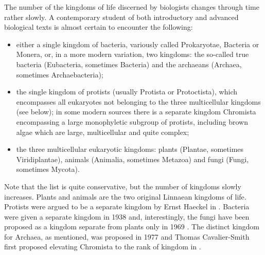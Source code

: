 \begin{artengenv}
The number of the kingdoms of life discerned by biologists changes through time rather slowly. A contemporary student of
both introductory and advanced biological texts is almost certain to encounter the following:

\begin{itemize}
\item either a single kingdom of bacteria, variously called Prokaryotae, Bacteria or Monera, or, in a more modern
variation, two kingdoms: the so-called true bacteria (Eubacteria, sometimes Bacteria) and the archaeans (Archaea,
sometimes Archaebacteria);
\item the single kingdom of protists (usually Protista or Protoctista), which encompasses all eukaryotes not belonging
to the three multicellular kingdoms (see below); in some modern sources
\parencite{ruggiero_higher_2015}
there is a separate kingdom Chromista encompassing a large monophyletic subgroup of protists, including brown
algae which are large, multicellular and quite complex;
\item the three multicellular eukaryotic kingdoms: plants (Plantae, sometimes Viridiplantae), animals (Animalia,
sometimes Metazoa) and fungi (Fungi, sometimes Mycota). 
\end{itemize}
Note that the list is quite conservative, but the number of kingdoms slowly increases. Plants and  animals are the two
original Linnaean kingdoms of life. Protists were argued to be a separate kingdom by Ernst Haeckel in
\parencite*{haeckel_generelle_1866}.
Bacteria were given a separate kingdom in 1938
\parencite{copeland_kingdoms_1938}
and, interestingly, the fungi have been proposed as a kingdom separate from
plants only in 1969
\parencite{whittaker_new_1969}.
The distinct kingdom for Archaea, as mentioned, was
proposed in 1977 and Thomas Cavalier-Smith first proposed elevating Chromista to the rank of kingdom in
\parencite*{cavalier-smith_eukaryote_1981}.


\end{artengenv}
